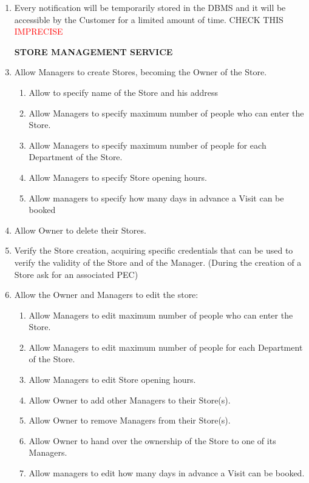 \documentclass[a4paper, 10pt, oneside]{article}
\newcommand*{\lorenzo}[1]{\textcolor{BurntOrange}{#1}}
\newcommand{\yasmin}[1]{\textcolor{Red}{#1}}
\begin{document}
\begin{enumerate}[align=left]
    \item Every notification will be temporarily stored in the DBMS and it will be accessible by the Customer for a limited amount of time. \lorenzo{CHECK THIS} \yasmin{IMPRECISE}%
    
    \item[\textbf{STORE MANAGEMENT SERVICE}]
    \item \label{req:man:createStore}Allow Managers to create Stores, becoming the Owner of the Store.
    \begin{enumerate}[label={-}]
        \item \label{req:man:createStore:nameAndLoc}Allow to specify name of the Store and his address
         \item \label{req:man:createStore:maxPeople}Allow Managers to specify maximum number of people who can enter the Store.
        \item \label{req:man:createStore:maxPeoplePerDep}Allow Managers to specify maximum number of people for each Department of the Store.
        \item \label{req:man:createStore:openingHours}Allow Managers to specify Store opening hours.
        \item \label{req:man:createStore:daysToBook}Allow managers to specify how many days in advance a Visit can be booked
    \end{enumerate}
    \item \label{req:man:deleteStore}Allow Owner to delete their Stores.
    \item \label{req:man:verifyOwnerCred}Verify the Store creation, acquiring specific credentials that can be used to verify the validity of the Store and of the Manager. \lorenzo{(During the creation of a Store ask for an associated PEC)}
    \item \label{req:man:updateStoreInfo}Allow the Owner and Managers to edit the store:
    \begin{enumerate}[label={-}]
         \item \label{req:man:updateStoreInfo:maxPeople}Allow Managers to edit maximum number of people who can enter the Store.
        \item \label{req:man:updateStoreInfo:maxPeoplePerDep}Allow Managers to edit maximum number of people for each Department of the Store.
        \item \label{req:man:updateStoreInfo:openingHours}Allow Managers to edit Store opening hours.
         \item \label{req:man:updateStoreInfo:addMan}Allow Owner to add other Managers to their Store(s).
        \item \label{req:man:updateStoreInfo:removeMan}Allow Owner to remove Managers from their Store(s).
        \item \label{req:man:updateStoreInfo:handOwnership}Allow Owner to hand over the ownership of the Store to one of its Managers.
        \item \label{req:man:updateStoreInfo:daysToBook}Allow managers to edit how many days in advance a Visit can be booked.
    \end{enumerate}
    

\end{enumerate}
\end{document}

